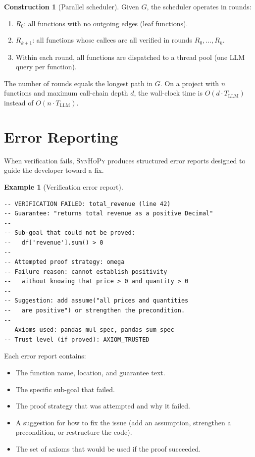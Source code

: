 \documentclass[11pt,a4paper]{report}
\theoremstyle{definition}
\newtheorem{example}[definition]{Example}
\newtheorem{construction}[definition]{Construction}
\theoremstyle{plain}
\newcommand{\synhopy}{\textsc{SynHoPy}}
\begin{document}
\begin{construction}[Parallel scheduler]
Given $G$, the scheduler operates in rounds:
\begin{enumerate}
  \item $R_0$: all functions with no outgoing edges (leaf functions).
  \item $R_{k+1}$: all functions whose callees are all verified in rounds
    $R_0, \ldots, R_k$.
  \item Within each round, all functions are dispatched to a thread pool
    (one LLM query per function).
\end{enumerate}
The number of rounds equals the longest path in $G$.  On a project with
$n$ functions and maximum call-chain depth $d$, the wall-clock time is
$O(d \cdot T_{\mathrm{LLM}})$ instead of $O(n \cdot T_{\mathrm{LLM}})$.
\end{construction}

\section{Error Reporting}

When verification fails, \synhopy{} produces structured error reports designed
to guide the developer toward a fix.

\begin{example}[Verification error report]
\begin{lstlisting}[style=proof]
-- VERIFICATION FAILED: total_revenue (line 42)
-- Guarantee: "returns total revenue as a positive Decimal"
--
-- Sub-goal that could not be proved:
--   df['revenue'].sum() > 0
--
-- Attempted proof strategy: omega
-- Failure reason: cannot establish positivity
--   without knowing that price > 0 and quantity > 0
--
-- Suggestion: add assume("all prices and quantities
--   are positive") or strengthen the precondition.
--
-- Axioms used: pandas_mul_spec, pandas_sum_spec
-- Trust level (if proved): AXIOM_TRUSTED
\end{lstlisting}
\end{example}

Each error report contains:
\begin{itemize}
  \item The function name, location, and guarantee text.
  \item The specific sub-goal that failed.
  \item The proof strategy that was attempted and why it failed.
  \item A suggestion for how to fix the issue (add an assumption, strengthen
    a precondition, or restructure the code).
  \item The set of axioms that would be used if the proof succeeded.
\end{itemize}
\end{document}
